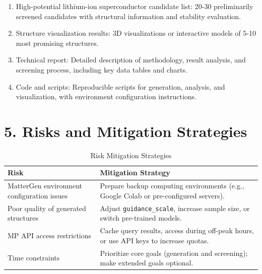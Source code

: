 \documentclass[letterpaper]{article} %
\begin{document}
\begin{enumerate}
    \item High-potential lithium-ion superconductor candidate list: 20-30 preliminarily screened candidates with structural information and stability evaluation.
    \item Structure visualization results: 3D visualizations or interactive models of 5-10 most promising structures.
    \item Technical report: Detailed description of methodology, result analysis, and screening process, including key data tables and charts.
    \item Code and scripts: Reproducible scripts for generation, analysis, and visualization, with environment configuration instructions.
\end{enumerate}


\section{5. Risks and Mitigation Strategies}

\begin{table}[H]
    \centering
    \caption{Risk Mitigation Strategies}
    \begin{tabular}{|p{2cm}|p{5.5cm}|}
        \hline
        \textbf{Risk} & \textbf{Mitigation Strategy} \\
        \hline
        MatterGen environment configuration issues & Prepare backup computing environments (e.g., Google Colab or pre-configured servers). \\
        \hline
        Poor quality of generated structures & Adjust \texttt{guidance\_scale}, increase sample size, or switch pre-trained models. \\
        \hline
        MP API access restrictions & Cache query results, access during off-peak hours, or use API keys to increase quotas. \\
        \hline
        Time constraints & Prioritize core goals (generation and screening); make extended goals optional. \\
        \hline
    \end{tabular}
\end{table}
\end{document}
